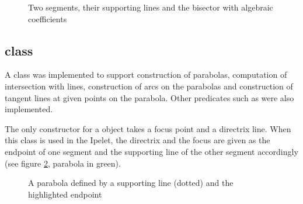 \documentclass[11pt,a4paper,english]{article}
\begin{document}
	\begin{figure}[h!]
    \centering
    \caption{Two segments, their supporting lines and the bisector with algebraic coefficients \label{fig:algebraic_line}}
	\end{figure}
	

	\subsection{ class}
	A  class was implemented to support construction of parabolas, computation of intersection with lines, construction of arcs on the parabolas and construction of tangent lines at given points on the parabola. Other predicates such as  were also implemented.\par
	The only constructor for a  object takes a focus point and a directrix line. When this class is used in the Ipelet, the directrix and the focus are given as the endpoint of one segment and the supporting line of the other segment accordingly (see figure \ref{fig:parabola}, parabola in green).
	\begin{figure}[h]
    \centering
    \caption{A parabola defined by a supporting line (dotted) and the highlighted endpoint \label{fig:parabola}}
	\end{figure}
	
\end{document}

